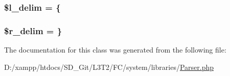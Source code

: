 \subsubsection[{\$l\+\_\+delim}]{\setlength{\rightskip}{0pt plus 5cm}\$l\+\_\+delim = \textquotesingle{}\{\textquotesingle{}}\label{class_c_i___parser_ab957da01a735e612795fba1c5802b1fb}
\hypertarget{class_c_i___parser_a4d80dc6a622989846dbd0e39fde0f3bb}{}
\subsubsection[{\$r\+\_\+delim}]{\setlength{\rightskip}{0pt plus 5cm}\$r\+\_\+delim = \textquotesingle{}\}\textquotesingle{}}\label{class_c_i___parser_a4d80dc6a622989846dbd0e39fde0f3bb}


The documentation for this class was generated from the following file\+:\begin{DoxyCompactItemize}
\item 
D\+:/xampp/htdocs/\+S\+D\+\_\+\+Git/\+L3\+T2/\+F\+C/system/libraries/\hyperlink{_parser_8php}{Parser.\+php}\end{DoxyCompactItemize}
